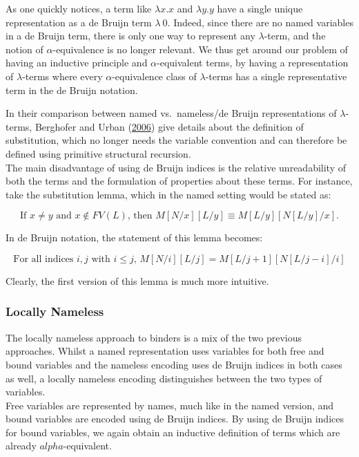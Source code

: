 \documentclass[a4paper, 12pt, twoside]{style/ociamthesis}
\theoremstyle{plain}
\theoremstyle{definition}
\theoremstyle{remark}
\begin{document}
As one quickly notices, a term like \(\lambda x.x\) and \(\lambda y.y\)
have a single unique representation as a de Bruijn term \(\lambda\ 0\).
Indeed, since there are no named variables in a de Bruijn term, there is
only one way to represent any \(\lambda\)-term, and the notion of
\(\alpha\)-equivalence is no longer relevant. We thus get around our
problem of having an inductive principle and \(\alpha\)-equivalent
terms, by having a representation of \(\lambda\)-terms where every
\(\alpha\)-equivalence class of \(\lambda\)-terms has a single
representative term in the de Bruijn notation.

In their comparison between named vs.~nameless/de Bruijn representations
of \(\lambda\)-terms, Berghofer and Urban
(\protect\hyperlink{ref-berghofer06}{2006}) give details about the
definition of substitution, which no longer needs the variable
convention and can therefore be defined using primitive structural
recursion.\\
The main disadvantage of using de Bruijn indices is the relative
unreadability of both the terms and the formulation of properties about
these terms. For instance, take the substitution lemma, which in the
named setting would be stated as:

\[\text{If }x \neq y\text{ and }x \not\in FV(L)\text{, then }
M[N/x][L/y] \equiv M[L/y][N[L/y]/x].\]

In de Bruijn notation, the statement of this lemma becomes:

\[\text{For all indices }i, j\text{ with }i \leq j\text{, }M[N/i][L/j] = M[L/j + 1][N[L/j - i]/i]\]

Clearly, the first version of this lemma is much more intuitive.

\subsubsection{Locally Nameless}\label{locally-nameless}

The locally nameless approach to binders is a mix of the two previous
approaches. Whilst a named representation uses variables for both free
and bound variables and the nameless encoding uses de Bruijn indices in
both cases as well, a locally nameless encoding distinguishes between
the two types of variables.\\
Free variables are represented by names, much like in the named version,
and bound variables are encoded using de Bruijn indices. By using de
Bruijn indices for bound variables, we again obtain an inductive
definition of terms which are already \(alpha\)-equivalent.
\end{document}
